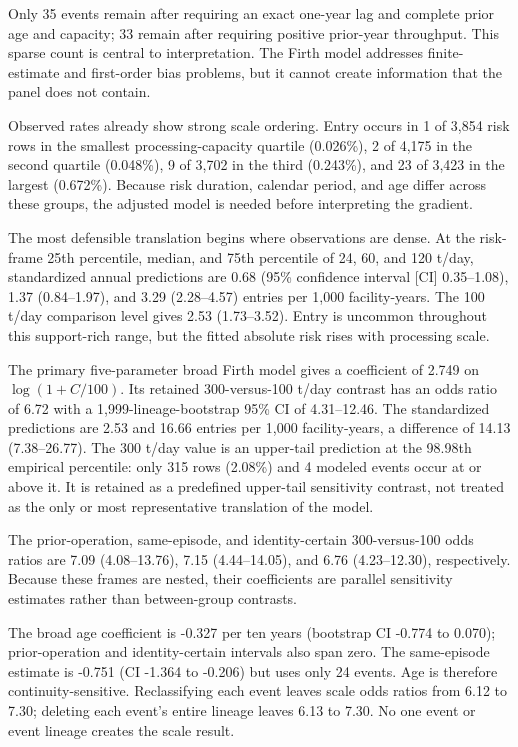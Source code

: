 \documentclass[12pt,letterpaper]{article}
\begin{document}
Only 35 events remain after requiring an exact one-year lag and complete prior
age and capacity; 33 remain after requiring positive prior-year throughput.
This sparse count is central to interpretation. The Firth model addresses
finite-estimate and first-order bias problems, but it cannot create information
that the panel does not contain.

Observed rates already show strong scale ordering. Entry occurs in 1 of 3,854
risk rows in the smallest processing-capacity quartile (0.026\%), 2 of 4,175 in
the second quartile (0.048\%), 9 of 3,702 in the third (0.243\%), and 23 of 3,423
in the largest (0.672\%). Because risk duration, calendar period, and age differ
across these groups, the adjusted model is needed before interpreting the
gradient.

The most defensible translation begins where observations are dense. At the
risk-frame 25th percentile, median, and 75th percentile of 24, 60, and 120
t/day, standardized annual predictions are 0.68 (95\% confidence interval [CI]
0.35--1.08), 1.37
(0.84--1.97), and 3.29 (2.28--4.57) entries per 1,000 facility-years. The 100
t/day comparison level gives 2.53 (1.73--3.52). Entry is uncommon
throughout this support-rich range, but the fitted absolute risk rises with
processing scale.

The primary five-parameter broad Firth model gives a coefficient of 2.749 on
$\log(1+C/100)$. Its retained 300-versus-100 t/day contrast has an odds ratio of
6.72 with a 1,999-lineage-bootstrap 95\% CI of 4.31--12.46. The standardized
predictions are 2.53 and 16.66 entries per 1,000 facility-years, a difference of
14.13 (7.38--26.77). The 300 t/day value is an upper-tail prediction at the 98.98th
empirical percentile: only 315 rows (2.08\%) and 4 modeled events occur at or
above it. It is retained as a predefined upper-tail sensitivity contrast, not
treated as the only or most representative translation of the model.

The prior-operation, same-episode, and identity-certain 300-versus-100 odds
ratios are 7.09 (4.08--13.76), 7.15 (4.44--14.05), and 6.76 (4.23--12.30),
respectively. Because these frames are nested, their coefficients are parallel
sensitivity estimates rather than between-group contrasts.

The broad age coefficient is -0.327 per ten years (bootstrap CI -0.774 to
0.070); prior-operation and identity-certain intervals also span zero. The
same-episode estimate is -0.751 (CI -1.364 to -0.206) but uses only 24 events.
Age is therefore continuity-sensitive. Reclassifying each event leaves scale
odds ratios from 6.12 to 7.30; deleting each event's entire lineage leaves 6.13
to 7.30. No one event or event lineage creates the scale result.
\end{document}

